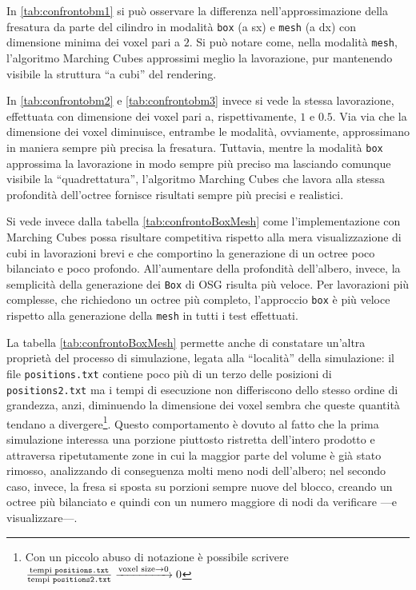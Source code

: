 In \ref{tab:confrontobm1} si può osservare la differenza nell'approssimazione della fresatura da parte del cilindro in modalità \texttt{box} (a sx) e \texttt{mesh} (a dx) con dimensione minima dei voxel pari a $2$. Si può notare come, nella modalità \texttt{mesh}, l'algoritmo Marching Cubes approssimi meglio la lavorazione, pur mantenendo visibile la struttura ``a cubi'' del rendering.

In \ref{tab:confrontobm2} e \ref{tab:confrontobm3} invece si vede la stessa lavorazione, effettuata con dimensione dei voxel pari a, rispettivamente, $1$ e $0.5$. Via via che la dimensione dei voxel diminuisce, entrambe le modalità, ovviamente, approssimano in maniera sempre più precisa la fresatura. Tuttavia, mentre la modalità \texttt{box} approssima la lavorazione in modo sempre più preciso ma lasciando comunque visibile la ``quadrettatura'', l'algoritmo Marching Cubes che lavora alla stessa profondità dell'octree fornisce risultati sempre più precisi e realistici.

Si vede invece dalla tabella \ref{tab:confrontoBoxMesh} come l'implementazione con Marching Cubes possa risultare competitiva rispetto alla mera visualizzazione di cubi in lavorazioni brevi e che comportino la generazione di un octree poco bilanciato e poco profondo. All'aumentare della profondità dell'albero, invece, la semplicità della generazione dei \texttt{Box} di OSG risulta più veloce. Per lavorazioni più complesse, che richiedono un octree più completo, l'approccio \texttt{box} è più veloce rispetto alla generazione della \texttt{mesh} in tutti i test effettuati.

La tabella \ref{tab:confrontoBoxMesh} permette anche di constatare un'altra proprietà del processo di simulazione, legata alla ``località'' della simulazione: il file \texttt{positions.txt} contiene poco più di un terzo delle posizioni di \texttt{positions2.txt} ma i tempi di esecuzione non differiscono dello stesso ordine di grandezza, anzi, diminuendo la dimensione dei voxel sembra che queste quantità tendano a divergere\footnote{Con un piccolo abuso di notazione è possibile scrivere $\frac{\text{tempi \texttt{positions.txt}}}{\text{tempi \texttt{positions2.txt}}} \xrightarrow{\text{voxel size} \rightarrow 0} 0$}. Questo comportamento è dovuto al fatto che la prima simulazione interessa una porzione piuttosto ristretta dell'intero prodotto e attraversa ripetutamente zone in cui la maggior parte del volume è già stato rimosso, analizzando di conseguenza molti meno nodi dell'albero; nel secondo caso, invece, la fresa si sposta su porzioni sempre nuove del blocco, creando un octree più bilanciato e quindi con un numero maggiore di nodi da verificare ---e visualizzare---.

